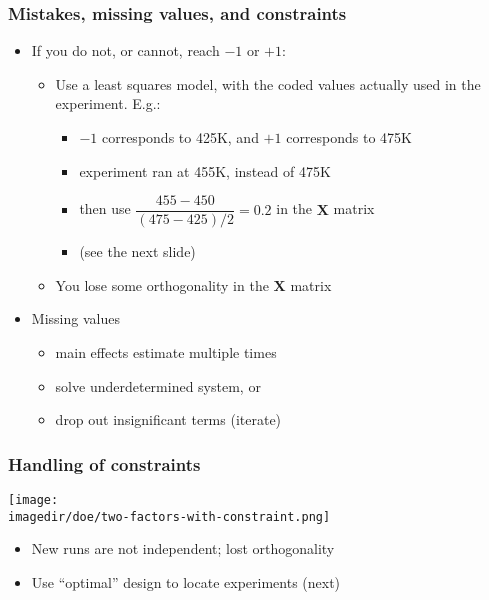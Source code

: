 \begin{frame}\frametitle{Mistakes, missing values, and constraints}
	\begin{itemize}
		\item	If you do not, or cannot, reach $-1$ or $+1$:
		\begin{itemize}
			\item	Use a least squares model, with the coded values actually used in the experiment. E.g.:
			\begin{itemize}
				\item	$-1$ corresponds to 425K, and $+1$ corresponds to 475K
				\item	experiment ran at 455K, instead of 475K 
				\item	then use $\dfrac{455 - 450}{(475 - 425)/2} = 0.2$ in the $\mathbf{X}$ matrix
				\item	(see the next slide)
			\end{itemize}
			\item	You lose some orthogonality in the $\mathbf{X}$ matrix
		\end{itemize}
	\end{itemize}
	\begin{itemize}
		\item	Missing values
		\begin{itemize}
			\item	main effects estimate multiple times
			\item	solve underdetermined system, or
			\item	drop out insignificant terms (iterate)
		\end{itemize}
	\end{itemize}
\end{frame}

\begin{frame}\frametitle{Handling of constraints}
	\begin{center}
		\texttt{[image: \\imagedir/doe/two-factors-with-constraint.png]}
	\end{center}
	\begin{itemize}
		\item	New runs are not independent; lost orthogonality
		\item	Use ``optimal'' design to locate experiments (next)
	\end{itemize}
\end{frame}

